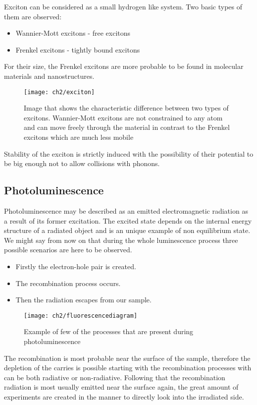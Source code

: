 Exciton can be considered as a small hydrogen like system. Two basic types of them are observed:

\begin{itemize}
\item Wannier-Mott excitons - free excitons
\item Frenkel excitons - tightly bound excitons
\end{itemize}

For their size, the Frenkel excitons are more probable to be found in molecular materials and nanostructures. 

\begin{figure}[H]
\centering
\texttt{[image: ch2/exciton]}
\caption{Image that shows the characteristic difference between two types of excitons. Wannier-Mott excitons are not constrained to any atom and can move freely through the material in contrast to the Frenkel excitons which are much less mobile\cite{fox}}
\end{figure}

Stability of the exciton is strictly induced with the possibility of their potential to be big enough not to allow collisions with phonons.

\subsection{Photoluminescence}

Photoluminescence may be described as an emitted electromagnetic radiation as a result of its former excitation. The excited state depends on the internal energy structure of a radiated object and is an unique example of non equilibrium state. We might say from now on that during the whole luminescence process three possible scenarios are here to be observed. 
\begin{itemize}
\item Firstly the electron-hole pair is created.
\item The recombination process occurs.
\item Then the radiation escapes from our sample.
\end{itemize}

\begin{figure}[H]
\centering
\texttt{[image: ch2/fluorescencediagram]}
\caption{Example of few of the processes that are present during photoluminescence\cite{princeton}}
\end{figure}


The recombination is most probable near the surface of the sample, therefore the depletion of the carries is possible starting with the recombination processes with can be both radiative or non-radiative. Following that the recombination radiation is most usually emitted near the surface again, the great amount of experiments are created in the manner to directly look into the irradiated side.

